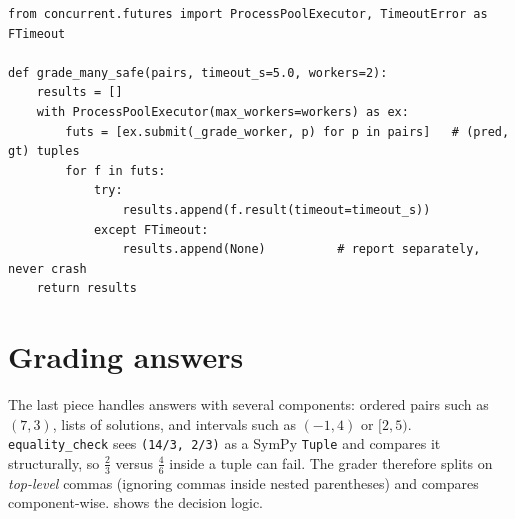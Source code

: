 \begin{lstlisting}[caption={Grading in a process pool with per-item timeouts.},label={lst:eval:safe}]
from concurrent.futures import ProcessPoolExecutor, TimeoutError as FTimeout

def grade_many_safe(pairs, timeout_s=5.0, workers=2):
    results = []
    with ProcessPoolExecutor(max_workers=workers) as ex:
        futs = [ex.submit(_grade_worker, p) for p in pairs]   # (pred, gt) tuples
        for f in futs:
            try:
                results.append(f.result(timeout=timeout_s))
            except FTimeout:
                results.append(None)          # report separately, never crash
    return results
\end{lstlisting}

\section{Grading answers}\label{sec:eval:grade}

The last piece handles answers with several components: ordered pairs such as $(7, 3)$, lists
of solutions, and intervals such as $(-1, 4)$ or $[2, 5)$. \texttt{equality\_check} sees
\texttt{(14/3, 2/3)} as a SymPy \texttt{Tuple} and compares it structurally, so $\tfrac{2}{3}$
versus $\tfrac{4}{6}$ inside a tuple can fail. The grader therefore splits on \emph{top-level}
commas (ignoring commas inside nested parentheses) and compares component-wise.
 shows the decision logic.

